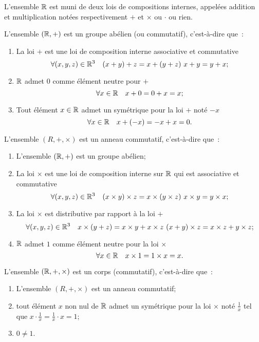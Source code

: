 L'ensemble $\mathbb{R}$ est muni de deux lois de compositions internes, appelées addition et multiplication notées respectivement $+$ et $\times$ ou $\cdot$ ou rien.
\begin{prop}
  L'ensemble $(\mathbb{R},+)$ est un groupe abélien (ou commutatif), c'est-à-dire que~:
  \begin{enumerate}
  \item La loi $+$ est une loi de composition interne associative et commutative
    \begin{equation}
      \forall (x,y,z) \in \R^3 \quad (x+y)+z=x+(y+z) \ x+y=y+x;
    \end{equation}
  \item $\mathbb{R}$ admet $0$ comme élément neutre pour $+$
    \begin{equation}
      \forall x \in \mathbb{R} \quad x+0=0+x=x;
    \end{equation}
  \item Tout élément $x\in\mathbb{R}$ admet un symétrique pour la loi $+$ noté $-x$
    \begin{equation}
      \forall x \in \mathbb{R} \quad x+(-x)=-x+x=0.
    \end{equation}
  \end{enumerate}
\end{prop}
\begin{prop}
  L'ensemble $(R,+,\times)$ est un anneau commutatif, c'est-à-dire que~:
  \begin{enumerate}
  \item L'ensemble $(\mathbb{R},+)$ est un groupe abélien;
  \item La loi $\times$ est une loi de composition interne sur $\mathbb{R}$ qui est associative et commutative
    \begin{equation}
      \forall (x,y,z) \in \mathbb{R}^3 \quad (x\times y)\times z=x\times (y\times z) \ x\times y=y\times x;
    \end{equation}
  \item La loi $\times$ est distributive par rapport à la loi $+$
    \begin{equation}
      \forall (x,y,z) \in \mathbb{R}^3 \quad x\times(y+z)=x\times y+x\times z \ (x+y)\times z=x\times z+y\times z;
    \end{equation}
  \item $\mathbb{R}$ admet $1$ comme élément neutre pour la loi $\times$
    \begin{equation}
      \forall x \in \mathbb{R} \quad x\times 1=1\times x=x.
    \end{equation}
  \end{enumerate}
\end{prop}
\begin{prop}
  L'ensemble $(\mathbb{R},+,\times)$ est un corps (commutatif), c'est-à-dire que~:
  \begin{enumerate}
  \item L'ensemble $(R,+,\times)$ est un anneau commutatif;
  \item tout élément $x$ non nul de $\mathbb{R}$ admet un symétrique pour la loi $\times$ noté $\frac{1}{x}$ tel que $x\cdot \frac{1}{x}=\frac{1}{x}\cdot x=1$;
  \item $0\neq 1$.
  \end{enumerate}
\end{prop}

